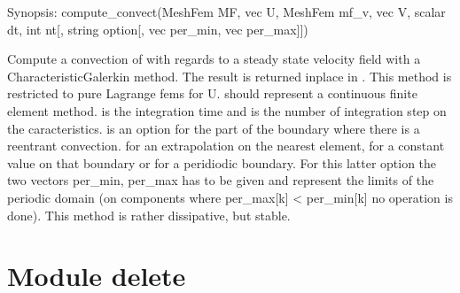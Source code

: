 \documentclass[a4paper,11pt,english]{sphinxmanual}
\begin{document}

\begin{fulllineitems}
\label{\detokenize{python/cmdref_Module compute:getfem.compute_convect}}
Synopsis: compute\_convect(MeshFem MF, vec U, MeshFem mf\_v, vec V, scalar dt, int nt{[}, string option{[}, vec per\_min, vec per\_max{]}{]})

Compute a convection of  with regards to a steady state velocity
field  with a Characteristic\sphinxhyphen{}Galerkin method. The result is returned
in\sphinxhyphen{}place in .
This method is restricted to pure Lagrange fems for U.  should
represent a continuous finite element method.  is the integration time
and  is the number of integration step on the caracteristics. 
is an option for the part of the boundary where there is a re\sphinxhyphen{}entrant
convection.
 for an extrapolation on the nearest element,
 for a constant value on that boundary or
 for a peridiodic boundary. For this latter option
the two vectors per\_min, per\_max has to be given and represent the limits
of the periodic domain (on components where per\_max{[}k{]} \textless{} per\_min{[}k{]}
no operation is done).
This method is rather dissipative, but stable.

\end{fulllineitems}



\section{Module delete}
\label{\detokenize{python/cmdref_Module delete:module-delete}}\label{\detokenize{python/cmdref_Module delete::doc}}
\end{document}

